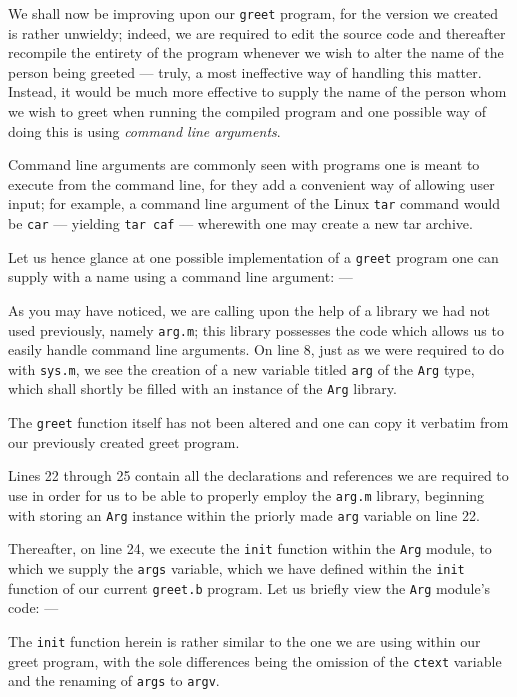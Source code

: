 \documentclass[a5paper,twoside,12pt]{report}
\begin{document}
We shall now be improving upon our \texttt{greet} program, for the version we created is rather unwieldy; indeed, we are required to edit the source code and thereafter recompile the entirety of the program whenever we wish to alter the name of the person being greeted — truly, a most ineffective way of handling this matter. Instead, it would be much more effective to supply the name of the person whom we wish to greet when running the compiled program and one possible way of doing this is using \textit{command line arguments}.

Command line arguments are commonly seen with programs one is meant to execute from the command line, for they add a convenient way of allowing user input; for example, a command line argument of the Linux \texttt{tar} command would be \texttt{car} — yielding \texttt{tar caf} — wherewith one may create a new tar archive.

Let us hence glance at one possible implementation of a \texttt{greet} program one can supply with a name using a command line argument: —



As you may have noticed, we are calling upon the help of a library we had not used previously, namely \texttt{arg.m}; this library possesses the code which allows us to easily handle command line arguments. On line 8, just as we were required to do with \texttt{sys.m}, we see the creation of a new variable titled \texttt{arg} of the \texttt{Arg} type, which shall shortly be filled with an instance of the \texttt{Arg} library.

The \texttt{greet} function itself has not been altered and one can copy it verbatim from our previously created greet program.

Lines 22 through 25 contain all the declarations and references we are required to use in order for us to be able to properly employ the \texttt{arg.m} library, beginning with storing an \texttt{Arg} instance within the priorly made \texttt{arg} variable on line 22. 

Thereafter, on line 24, we execute the \texttt{init} function within the \texttt{Arg} module, to which we supply the \texttt{args} variable, which we have defined within the \texttt{init} function of our current \texttt{greet.b} program. Let us briefly view the \texttt{Arg} module's code: —



The \texttt{init} function herein is rather similar to the one we are using within our greet program, with the sole differences being the omission of the \texttt{ctext} variable and the renaming of \texttt{args} to \texttt{argv}.
\end{document}
